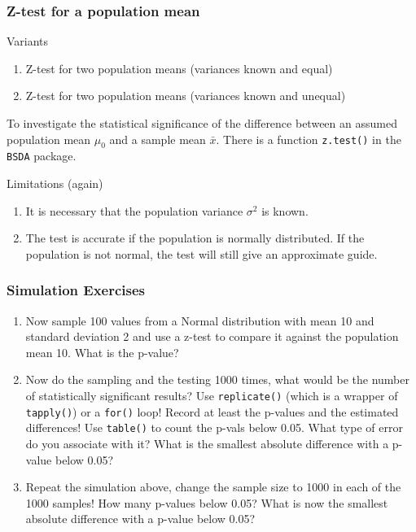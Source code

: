 \documentclass[xcolor={table}]{beamer}
\begin{document}
\begin{frame}\frametitle{Z-test for a population mean} 
  \begin{block}{Variants}
    \begin{enumerate}
      \item Z-test for two population means (variances known and equal)
      \item Z-test for two population means (variances known and unequal)
    \end{enumerate}
    To investigate the statistical significance of the difference between an assumed population mean $\mu_0$ and a sample mean $\bar{x}$. There is a function \texttt{z.test()} in the \texttt{BSDA} package.
  \end{block}
  \begin{alertblock}{Limitations (again)}
    \begin{enumerate}
      \item It is necessary that the population variance $\sigma^2$ is known. 
      \item The test is accurate if the population is normally distributed. If the population is not normal, the test will still give an approximate guide.
    \end{enumerate}
  \end{alertblock}
\end{frame}


\begin{frame}\frametitle{Simulation Exercises} 
  \begin{enumerate}
  \item Now sample 100 values from a Normal distribution with mean 10 and standard deviation 2 and use a z-test to compare it against the population mean 10. What is the p-value?
  \item Now do the sampling and the testing 1000 times, what would be the number of statistically significant results? Use \texttt{replicate()} (which is a wrapper of \texttt{tapply()}) or a \texttt{for()} loop! Record at least the p-values and the estimated differences! Use \texttt{table()} to count the p-vals below 0.05. What type of error do you associate with it? What is the smallest absolute difference with a p-value below 0.05?
  \item Repeat the simulation above, change the sample size to 1000 in each of the 1000 samples! How many p-values below 0.05? What is now the smallest absolute difference with a p-value below 0.05?
  \end{enumerate}
\end{frame}
\end{document}
